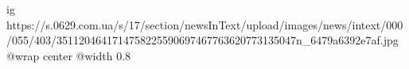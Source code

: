  
 
 
 
 

\ifcmt
  ig https://s.0629.com.ua/s/17/section/newsInText/upload/images/news/intext/000/055/403/3511204641714758225590697467763620773135047n_6479a6392e7af.jpg
  @wrap center
  @width 0.8
\fi
